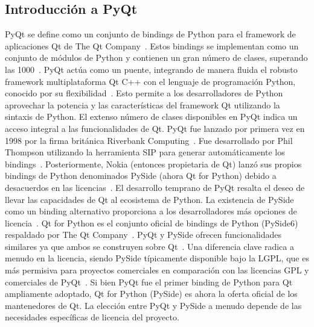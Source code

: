 \subsection{Introducción a PyQt}
PyQt se define como un conjunto de bindings de Python para el framework de aplicaciones Qt de The Qt Company~\cite{pyqt_wiki}. Estos bindings se implementan como un conjunto de módulos de Python y contienen un gran número de clases, superando las 1000~\cite{pyqt_wiki}. PyQt actúa como un puente, integrando de manera fluida el robusto framework multiplataforma Qt C++ con el lenguaje de programación Python, conocido por su flexibilidad~\cite{qt_for_python}. Esto permite a los desarrolladores de Python aprovechar la potencia y las características del framework Qt utilizando la sintaxis de Python. El extenso número de clases disponibles en PyQt indica un acceso integral a las funcionalidades de Qt.
PyQt fue lanzado por primera vez en 1998 por la firma británica Riverbank Computing~\cite{pyqt_wiki}. Fue desarrollado por Phil Thompson utilizando la herramienta SIP para generar automáticamente los bindings~\cite{pyqt_wiki}. Posteriormente, Nokia (entonces propietaria de Qt) lanzó sus propios bindings de Python denominados PySide (ahora Qt for Python) debido a desacuerdos en las licencias~\cite{pyqt_wiki}. El desarrollo temprano de PyQt resalta el deseo de llevar las capacidades de Qt al ecosistema de Python. La existencia de PySide como un binding alternativo proporciona a los desarrolladores más opciones de licencia~\cite{tutorialspoint_pyqt}.
Qt for Python es el conjunto oficial de bindings de Python (PySide6) respaldado por The Qt Company~\cite{qt_for_python}. PyQt y PySide ofrecen funcionalidades similares ya que ambos se construyen sobre Qt~\cite{tutorialspoint_pyqt}. Una diferencia clave radica a menudo en la licencia, siendo PySide típicamente disponible bajo la LGPL, que es más permisiva para proyectos comerciales en comparación con las licencias GPL y comerciales de PyQt~\cite{tutorialspoint_pyqt}. Si bien PyQt fue el primer binding de Python para Qt ampliamente adoptado, Qt for Python (PySide) es ahora la oferta oficial de los mantenedores de Qt. La elección entre PyQt y PySide a menudo depende de las necesidades específicas de licencia del proyecto.

